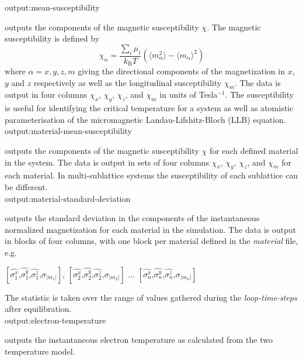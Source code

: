 {\zicf output:mean-susceptibility}
outputs the components of the magnetic susceptibility $\chi$. The magnetic susceptibility is defined by
\begin{equation*}
\chi_{\alpha} = \frac{\sum_i \mu_i}{k_{\mathrm{B}}T}\left(\langle m_{\alpha}^2\rangle - \langle m_{\alpha}\rangle^2 \right)
\end{equation*}
where $\alpha = x,y,z,m$ giving the directional components of the magnetization in $x$, $y$ and $z$
respectively as well as the longitudinal susceptibility $\chi_m$. The data is output in four columns
$\chi_x$, $\chi_y$, $\chi_z$, and $\chi_m$ in units of Tesla$^{-1}$. The susceptibility is useful for identifying the critical
temperature for a system as well as atomistic parameterisation of the micromagnetic
Landau-Lifshitz-Bloch (LLB) equation.\\

{\zicf output:material-mean-susceptibility} outputs
the components of the magnetic susceptibility $\chi$ for each defined material in the system. The data is output in sets of
four columns $\chi_x$, $\chi_y$, $\chi_z$, and $\chi_m$ for each material. In multi-sublattice systems the susceptibility of
each sublattice can be different.\\

{\zicf output:material-standard-deviation} outputs
the standard deviation in the components of the instantaneous normalized magnetization for each material in the simulation.
The data is output in blocks of four columns, with one block per material defined in
the \textit{material} file, e.g.

\begin{center}
$\left[ \hat{\sigma_1^x} \textrm{,} \hat{\sigma_1^y} \textrm{,} \hat{\sigma_1^z} \textrm{,} \sigma_{|m_1|} \right]$,
$\left[ \hat{\sigma_2^x} \textrm{,} \hat{\sigma_2^y} \textrm{,} \hat{\sigma_2^z} \textrm{,} \sigma_{|m_2|} \right]$ ...
$\left[ \hat{\sigma_n^x} \textrm{,} \hat{\sigma_n^y} \textrm{,} \hat{\sigma_n^z} \textrm{,} \sigma_{|m_n|} \right]$
\end{center}

The statistic is taken over the range of values gathered during the \textit{loop-time-steps} after equilibration.\\

{\zicf output:electron-temperature} outputs the instantaneous electron temperature as calculated from the two temperature model.\\

